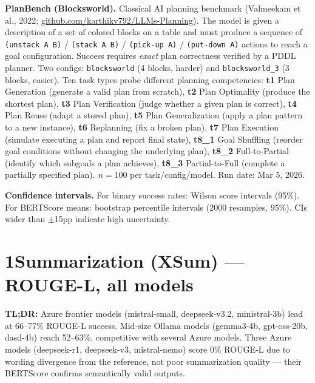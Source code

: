 \documentclass[11pt,letterpaper]{article}
\begin{document}
\textbf{PlanBench (Blocksworld).} Classical AI planning benchmark (Valmeekam et al., 2022; \href{https://github.com/karthikv792/LLMs-Planning}{github.com/karthikv792/LLMs-Planning}). The model is given a description of a set of colored blocks on a table and must produce a sequence of \texttt{(unstack A B)} / \texttt{(stack A B)} / \texttt{(pick-up A)} / \texttt{(put-down A)} actions to reach a goal configuration. Success requires \emph{exact} plan correctness verified by a PDDL planner. Two configs: \texttt{blocksworld} (4 blocks, harder) and \texttt{blocksworld\_3} (3 blocks, easier). Ten task types probe different planning competencies: \textbf{t1} Plan Generation (generate a valid plan from scratch), \textbf{t2} Plan Optimality (produce the shortest plan), \textbf{t3} Plan Verification (judge whether a given plan is correct), \textbf{t4} Plan Reuse (adapt a stored plan), \textbf{t5} Plan Generalization (apply a plan pattern to a new instance), \textbf{t6} Replanning (fix a broken plan), \textbf{t7} Plan Execution (simulate executing a plan and report final state), \textbf{t8\_1} Goal Shuffling (reorder goal conditions without changing the underlying plan), \textbf{t8\_2} Full-to-Partial (identify which subgoals a plan achieves), \textbf{t8\_3} Partial-to-Full (complete a partially specified plan). $n=100$ per task/config/model. Run date: Mar 5, 2026.

\textbf{Confidence intervals.} For binary success rates: Wilson score intervals (95\%). For BERTScore means: bootstrap percentile intervals (2000 resamples, 95\%). CIs wider than $\pm$15pp indicate high uncertainty.

\newpage

\section*{1\quad Summarization (XSum) --- ROUGE-L, all models}

\noindent\textbf{TL;DR:} Azure frontier models (mistral-small, deepseek-v3.2, ministral-3b) lead at 66--77\% ROUGE-L success. Mid-size Ollama models (gemma3-4b, gpt-oss-20b, dasd-4b) reach 52--63\%, competitive with several Azure models. Three Azure models (deepseek-r1, deepseek-v3, mistral-nemo) score 0\% ROUGE-L due to wording divergence from the reference, not poor summarization quality --- their BERTScore confirms semantically valid outputs.
\end{document}
